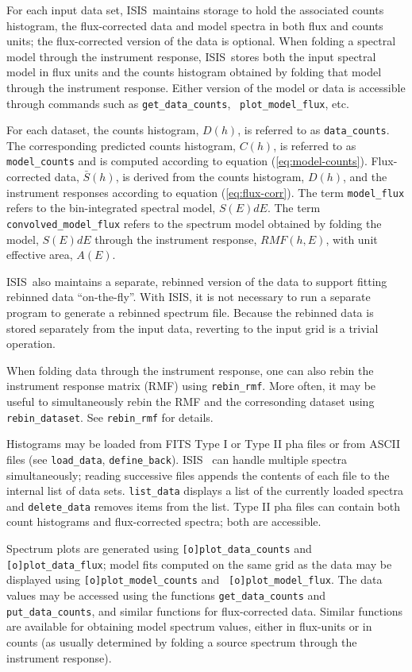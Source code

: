 \documentclass{book}
\newcommand{\isisx}{{\sc ISIS~}}
\newcommand{\isis}{{\sc ISIS}}
\begin{document}
{For each input data set, \isisx maintains storage to hold the
associated counts histogram, the flux-corrected data and model spectra
in both flux and counts units; the flux-corrected version of the data
is optional.  When folding a spectral model through the instrument
response, \isisx stores both the input spectral model in flux units
and the counts histogram obtained by folding that model through the
instrument response.  Either version of the model or data is accessible
through commands such as {\tt get\_data\_counts}, {\tt
plot\_model\_flux}, etc.

For each dataset, the counts histogram, $D(h)$, is referred to
as \verb|data_counts|.  The corresponding predicted counts
histogram, $C(h)$, is referred to as \verb|model_counts| and is
computed according to equation (\ref{eq:model-counts}).
Flux-corrected data, ${\bar S(h)}$, is derived from the counts
histogram, $D(h)$, and the instrument responses according to
equation (\ref{eq:flux-corr}).  The term \verb|model_flux|
refers to the bin-integrated spectral model, $S(E)dE$. The term
\verb|convolved_model_flux| refers to the spectrum model
obtained by folding the model, $S(E)dE$ through the instrument
response, $RMF(h,E)$, with unit effective area, $A(E)$.

\isisx also maintains a separate, rebinned version of the data to
support fitting rebinned data ``on-the-fly''.  With \isis, it is not
necessary to run a separate program to generate a rebinned spectrum
file.  Because the rebinned data is stored separately from the input
data, reverting to the input grid is a trivial operation.

When folding data through the instrument response, one can also
rebin the instrument response matrix (RMF) using \verb|rebin_rmf|.
More often, it may be useful to simultaneously rebin the RMF and
the corresonding dataset using \verb|rebin_dataset|.
See \verb|rebin_rmf| for details.

Histograms may be loaded from FITS Type I or Type II pha files or
from ASCII files (see \verb|load_data|, \verb|define_back|).  \isisx
can handle multiple spectra simultaneously; reading successive
files appends the contents of each file to the internal list of
data sets.  {\tt list\_data} displays a list of the currently
loaded spectra and {\tt delete\_data} removes items from the list.
Type II pha files can contain both count histograms and
flux-corrected spectra; both are accessible.

Spectrum plots are generated using {\tt [o]plot\_data\_counts} and
{\tt [o]plot\_data\_flux}; model fits computed on the same grid as the
data may be displayed using {\tt [o]plot\_model\_counts} and {\tt
[o]plot\_model\_flux}.  The data values may be accessed using the
functions {\tt get\_data\_counts} and {\tt put\_data\_counts}, and
similar functions for flux-corrected data. Similar functions are
available for obtaining model spectrum values, either in flux-units or
in counts (as usually determined by folding a source spectrum through
the instrument response).

}
\end{document}
